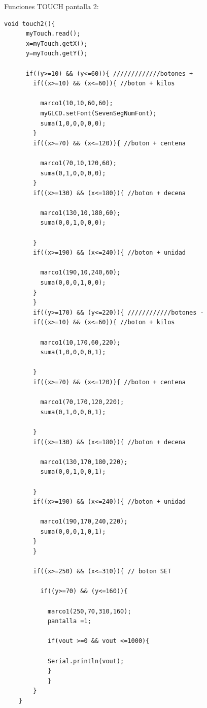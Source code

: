  Funciones TOUCH pantalla 2:
\begin{verbatim}
void touch2(){
      myTouch.read();
      x=myTouch.getX();
      y=myTouch.getY();

      if((y>=10) && (y<=60)){ /////////////botones +
        if((x>=10) && (x<=60)){ //boton + kilos
        
          marco1(10,10,60,60);
          myGLCD.setFont(SevenSegNumFont); 
          suma(1,0,0,0,0,0);
        }
        if((x>=70) && (x<=120)){ //boton + centena
        
          marco1(70,10,120,60);
          suma(0,1,0,0,0,0);
        }
        if((x>=130) && (x<=180)){ //boton + decena
        
          marco1(130,10,180,60); 
          suma(0,0,1,0,0,0);
          
        }
        if((x>=190) && (x<=240)){ //boton + unidad
        
          marco1(190,10,240,60);
          suma(0,0,0,1,0,0);
        }
        }
        if((y>=170) && (y<=220)){ ////////////botones -
        if((x>=10) && (x<=60)){ //boton + kilos
        
          marco1(10,170,60,220);
          suma(1,0,0,0,0,1);
          
        }
        if((x>=70) && (x<=120)){ //boton + centena
        
          marco1(70,170,120,220);
          suma(0,1,0,0,0,1);
          
        }
        if((x>=130) && (x<=180)){ //boton + decena
        
          marco1(130,170,180,220);
          suma(0,0,1,0,0,1);
          
        }
        if((x>=190) && (x<=240)){ //boton + unidad
        
          marco1(190,170,240,220);
          suma(0,0,0,1,0,1);
        }
        }

        if((x>=250) && (x<=310)){ // boton SET

          if((y>=70) && (y<=160)){
          
            marco1(250,70,310,160);
            pantalla =1;
            
            if(vout >=0 && vout <=1000){
            
            Serial.println(vout);
            }
            }    
        }
    }
    
\end{verbatim}

